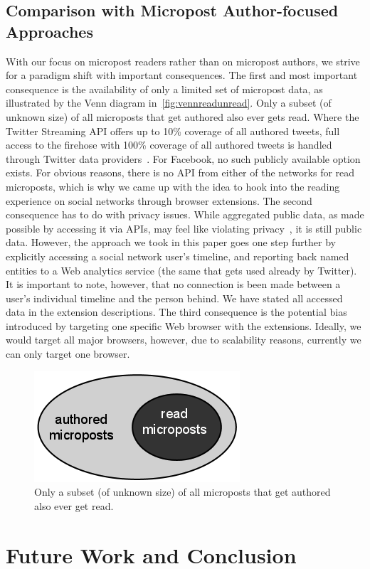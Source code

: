 \documentclass{iosart2c}
\begin{document}
\subsection{Comparison with Micropost Author-focused Approaches}
With our focus on micropost readers rather than on micropost authors, we strive for a paradigm shift with important consequences.
The first and most important consequence is the availability of only a limited set of micropost data, as illustrated by the Venn diagram in~\autoref{fig:vennreadunread}.
Only a subset (of unknown size) of all microposts that get authored also ever gets read.
Where the Twitter Streaming API offers up to 10\% coverage of all authored tweets, full access to the firehose with 100\% coverage of all authored tweets is handled through Twitter data providers~\cite{dataproviders}.
For Facebook, no such publicly available option exists.
For obvious reasons, there is no API from either of the networks for read microposts, which is why we came up with the idea to hook into the reading experience on social networks through browser extensions.
The second consequence has to do with privacy issues.
While aggregated public data, as made possible by accessing it via APIs, may feel like violating privacy~\cite{nyt}, it is still public data.
However, the approach we took in this paper goes one step further by explicitly accessing a social network user's timeline, and reporting back named entities to a Web analytics service (the same that gets used already by Twitter). 
It is important to note, however, that no connection is been made between a user's individual timeline and the person behind.
We have stated all accessed data in the extension descriptions.
The third consequence is the potential bias introduced by targeting one specific Web browser with the extensions.
Ideally, we would target all major browsers, however, due to scalability reasons, currently we can only target one browser.

\begin{figure}
\centering
\includegraphics[width=0.4\linewidth]{./resources/vennreadunread.png}
\caption{Only a subset (of unknown size) of all microposts that get authored also ever get read.}
\label{fig:vennreadunread}
\end{figure}

\section{Future Work and Conclusion} \label{sec:futureworkandconclusion}



\end{document}
